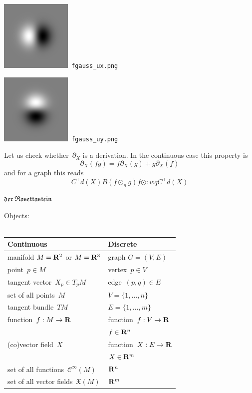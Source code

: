 \includegraphics{fgauss_ux.png}\verb+ fgauss_ux.png+

\includegraphics{fgauss_uy.png}\verb+ fgauss_uy.png+


Let us check whether~$\partial_X$ is a derivation.  In the continuous case
this property is
\[
	\partial_X\left(fg\right)
	=
	f\partial_X\left(g\right)
	+
	g\partial_X\left(f\right)
\]
and for a graph this reads
\[
	C^\top d(X)B\left(f\odot_n g\right)
	f\odot :wqC^\top d(X)
\]

\clearpage
{\Huge $\mathfrak{der\ Rosettastein}$}

Objects:\\
\vspace{-0.5em}\\
\begin{tabular}{|l|l|}
	\hline
	\bf Continuous & \bf Discrete \\
	\hline
	manifold $M=\mathbf{R}^2$ or $M=\mathbf{R}^3$ & graph $G=(V,E)$ \\
	\hline
	point~$p\in M$ & vertex~$p\in V$ \\
	\hline
	tangent vector~$X_p\in T_pM$ & edge~$(p,q)\in E$ \\
	\hline
	set of all points~$M$ & $V=\{1,\ldots,n\}$ \\
	\hline
	tangent bundle~$TM$ & $E=\{1,\ldots,m\}$ \\
	\hline
	function~$f:M\to\mathbf{R}$ & function~$f:V\to\mathbf{R}$ \\
	& $f\in\mathbf{R}^n$ \\
	\hline
	(co)vector field~$X$ & function~$X:E\to\mathbf{R}$ \\
	& $X\in\mathbf{R}^m$ \\
	\hline
	set of all functions~$\mathcal{C}^\infty(M)$ & $\mathbf{R}^n$ \\
	\hline
	set of all vector fields~$\mathfrak{X}(M)$ & $\mathbf{R}^m$ \\
	\hline
\end{tabular}


